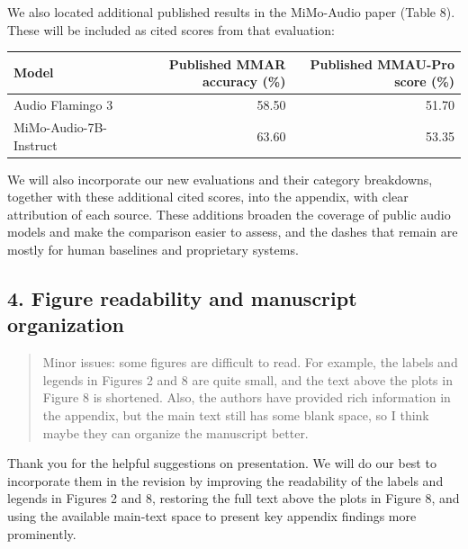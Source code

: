 We also located additional published results in the MiMo-Audio paper (Table 8). These will be included as cited scores from that evaluation:

\par\medskip
\begingroup
\small
\setlength{\tabcolsep}{5pt}
\renewcommand{\arraystretch}{1.2}
\noindent\begin{tabularx}{\linewidth}{@{}LRR@{}}
\toprule
\textbf{Model} & \textbf{Published MMAR accuracy (\%)} & \textbf{Published MMAU-Pro score (\%)} \\
\midrule
Audio Flamingo 3 & 58.50 & 51.70 \\
MiMo-Audio-7B-Instruct & 63.60 & 53.35 \\
\bottomrule
\end{tabularx}
\par\endgroup\medskip

We will also incorporate our new evaluations and their category breakdowns, together with these additional cited scores, into the appendix, with clear attribution of each source. These additions broaden the coverage of public audio models and make the comparison easier to assess, and the dashes that remain are mostly for human baselines and proprietary systems.

\subsection*{4. Figure readability and manuscript organization}

\begin{quote}\small\color{ReviewQuote}
Minor issues: some figures are difficult to read. For example, the labels and legends in Figures 2 and 8 are quite small, and the text above the plots in Figure 8 is shortened. Also, the authors have provided rich information in the appendix, but the main text still has some blank space, so I think maybe they can organize the manuscript better.

\end{quote}

Thank you for the helpful suggestions on presentation. We will do our best to incorporate them in the revision by improving the readability of the labels and legends in Figures 2 and 8, restoring the full text above the plots in Figure 8, and using the available main-text space to present key appendix findings more prominently.
